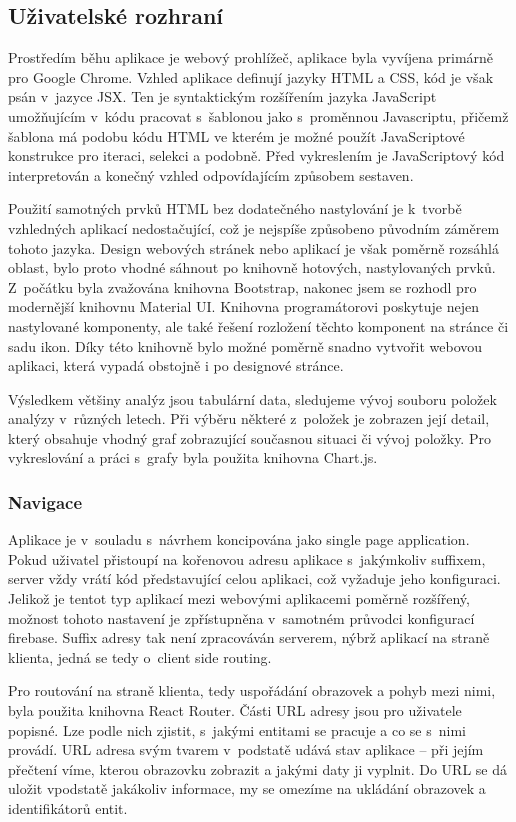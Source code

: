 \subsection{Uživatelské rozhraní}

Prostředím běhu aplikace je webový prohlížeč, aplikace byla vyvíjena primárně pro Google Chrome. Vzhled aplikace definují jazyky HTML a CSS, kód je však psán v~jazyce JSX. Ten je syntaktickým rozšířením jazyka JavaScript umožňujícím v~kódu pracovat s~šablonou jako s~proměnnou Javascriptu, přičemž šablona má podobu kódu HTML ve kterém je možné použít JavaScriptové konstrukce pro iteraci, selekci a podobně. Před vykreslením je JavaScriptový kód interpretován a konečný vzhled odpovídajícím způsobem sestaven.

Použití samotných prvků HTML bez dodatečného nastylování je k~tvorbě vzhledných aplikací nedostačující, což je nejspíše způsobeno původním záměrem tohoto jazyka. Design webových stránek nebo aplikací je však poměrně rozsáhlá oblast, bylo proto vhodné sáhnout po knihovně hotových, nastylovaných prvků. Z~počátku byla zvažována knihovna Bootstrap, nakonec jsem se rozhodl pro modernější knihovnu Material UI. Knihovna programátorovi poskytuje nejen nastylované komponenty, ale také řešení rozložení těchto komponent na stránce či sadu ikon. Díky této knihovně bylo možné poměrně snadno vytvořit webovou aplikaci, která vypadá obstojně i po designové stránce.

Výsledkem většiny analýz jsou tabulární data, sledujeme vývoj souboru položek analýzy v~různých letech. Při výběru některé z~položek je zobrazen její detail, který obsahuje vhodný graf zobrazující současnou situaci či vývoj položky. Pro vykreslování a práci s~grafy byla použita knihovna Chart.js.

\subsubsection{Navigace}
Aplikace je v~souladu s~návrhem koncipována jako single page application. Pokud uživatel přistoupí na kořenovou adresu aplikace s~jakýmkoliv suffixem, server vždy vrátí kód představující celou aplikaci, což vyžaduje jeho konfiguraci. Jelikož je tentot typ aplikací mezi webovými aplikacemi poměrně rozšířený, možnost tohoto nastavení je zpřístupněna v~samotném průvodci konfigurací firebase. Suffix adresy tak není zpracováván serverem, nýbrž aplikací na straně klienta, jedná se tedy o~client side routing.

Pro routování na straně klienta, tedy uspořádání obrazovek a pohyb mezi nimi, byla použita knihovna React Router. Části URL adresy jsou pro uživatele popisné. Lze podle nich zjistit, s~jakými entitami se pracuje a co se s~nimi provádí. URL adresa svým tvarem v~podstatě udává stav aplikace -- při jejím přečtení víme, kterou obrazovku zobrazit a jakými daty ji vyplnit. Do URL se dá uložit vpodstatě jakákoliv informace, my se omezíme na ukládání obrazovek a identifikátorů entit.

